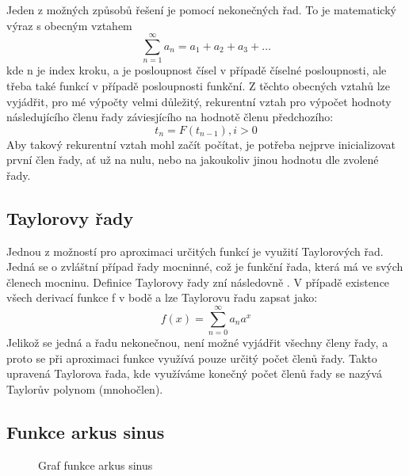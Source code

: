 \documentclass[12pt,a4paper,titlepage,final]{article}
\begin{document}
Jeden z možných způsobů řešení je pomocí nekonečných řad.
To je matematický výraz s obecným vztahem
\begin{equation}\label{eq:nekonecna_rada}
\sum_{n=1}^{\infty }a_{n} = a_{1} + a_{2} + a_{3} + \dots
\end{equation}
kde n je index kroku, a je posloupnost čísel v případě číselné posloupnosti,
ale třeba také funkcí v případě posloupnosti funkční. Z těchto obecných vztahů
lze vyjádřit, pro mé výpočty velmi důležitý, rekurentní vztah pro výpočet
hodnoty následujícího členu řady záviesjícího na hodnotě členu předchozího:
\begin{equation}\label{eq:rekurentni_vztah}
t_{n} = F(t_{n-1}), i>0
\end{equation}
Aby takový rekurentní vztah mohl začít počítat, je potřeba nejprve
inicializovat první člen řady, ať už na nulu, nebo na jakoukoliv jinou
hodnotu dle zvolené řady.


\subsection{Taylorovy řady}

Jednou z možností pro aproximaci určitých funkcí je využití Taylorových řad.
Jedná se o zvláštní případ řady mocninné, což je funkční řada, která má ve
svých členech mocninu. Definice Taylorovy řady zní následovně \cite{vzorce}.
V případě existence všech derivací funkce f v bodě a lze Taylorovu řadu zapsat
jako:
\begin{equation}\label{eq:taylorova_rada}
f(x)=\sum_{n=0}^{\infty }a_{n}a^{x}
\end{equation}
Jelikož se jedná a řadu nekonečnou, není možné vyjádřit všechny členy řady, 
a proto se při aproximaci funkce využívá pouze určitý počet členů řady.
Takto upravená Taylorova řada, kde využíváme konečný počet členů řady se nazývá
Taylorův polynom (mnohočlen).

\subsection{Funkce arkus sinus}\label{arcsin}

\begin{figure}
  \centering
  
  \caption{Graf funkce arkus sinus}
  \label{fig:arkus_sinus}
\end{figure}
\end{document}
